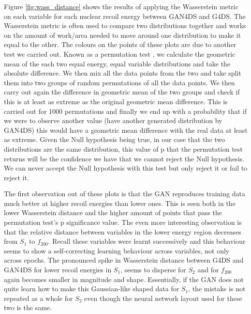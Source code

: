 \documentclass[11pt]{article} %
\begin{document}
Figure \ref{fig:wass_distance} shows the results of applying the Wasserstein metric \cite{ramdas2017wasserstein} on each variable for each nuclear recoil energy
between GAN4DS and G4DS.
The Wasserstein metric is often used to compare two distributions together and works on the amount of work/area needed to move around one distribution
to make it equal to the other.
The colours on the points of these plots are due to another test we carried out.
Known as a permutation test \cite{pitman1937significance} \cite{efron1994introduction}, we calculate the geometric mean of the each two equal energy, equal variable distributions and take the absolute difference.
We then mix all the data points from the two and take split them into two groups of random permutations of all the data points.
We then carry out again the difference in geometric mean of the two groups and check if this is at least as extreme as the original geometric mean difference.
This is carried out for 1000 permutations and finally we end up with a probability that if we were to observe another value (have another generated distribution by GAN4DS)
this would have a geometric mean difference with the real data at least as extreme.
Given the Null hypothesis being true, in our case that the two distributions are the same distribution,
this value of p that the permutation test returns will be the confidence we have that we cannot reject the Null hypothesis.
We can never accept the Null hypothesis with this test but only reject it or fail to reject it.
\\
\par The first observation out of these plots is that the GAN reproduces training data much better at higher recoil energies
than lower ones.
This is seen both in the lower Wasserstein distance and the higher amount of points that pass
the permutation test's p significance value.
The even more interesting observation is that the relative distance between variables in the lower energy region
decreases from $S_1$ to $f_{200}$.
Recall these variables were learnt successively and this behaviour seems to show a self-correcting learning behaviour
across variables, not only across epochs.
The pronounced spike in Wasserstein distance between G4DS and GAN4DS for lower recoil energies in $S_1$, seems to disperse for $S_2$ and
for $f_{200}$ again becomes smaller in magnitude and shape.
Essentially, if the GAN does not quite learn how to make this Gaussian-like shaped data for $S_1$, the mistake
is not repeated as a whole for $S_2$ even though the neural network layout used for these two is the same.
\end{document}
